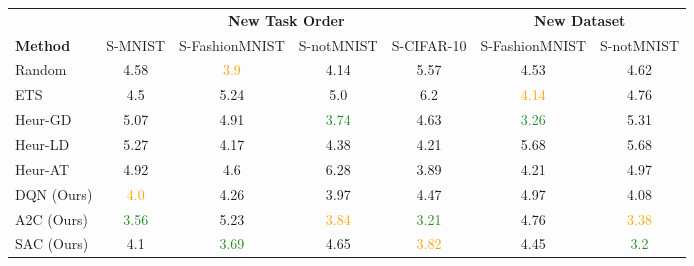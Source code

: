 \begin{tabular}{lcccccc}
\toprule	
	& \multicolumn{4}{c}{\textbf{New Task Order}}        & \multicolumn{2}{c}{\textbf{New Dataset}} \\
	\cmidrule(lr){2-5} \cmidrule(lr){6-7}
	\textbf{Method} & S-MNIST & S-FashionMNIST & S-notMNIST & S-CIFAR-10 & S-FashionMNIST        & S-notMNIST       \\
	\midrule
	Random          & 4.58    & \textcolor{orange}{3.9}            & 4.14       & 5.57       & 4.53                  & 4.62             \\
	ETS             & 4.5     & 5.24           & 5.0          & 6.2        & \textcolor{orange}{4.14}                  & 4.76             \\
	\midrule
	Heur-GD         & 5.07    & 4.91           & \textcolor{forestgreen}{3.74}       & 4.63       & \textcolor{forestgreen}{3.26}                  & 5.31             \\
	Heur-LD         & 5.27    & 4.17           & 4.38       & 4.21       & 5.68                  & 5.68             \\
	Heur-AT         & 4.92    & 4.6            & 6.28       & 3.89       & 4.21                  & 4.97             \\
	\midrule 
	DQN (Ours)      & \textcolor{orange}{4.0}       & 4.26           & 3.97       & 4.47       & 4.97                  & 4.08             \\
	A2C (Ours)      & \textcolor{forestgreen}{3.56}    & 5.23           & \textcolor{orange}{3.84}       & \textcolor{forestgreen}{3.21}       & 4.76                  & \textcolor{orange}{3.38}             \\
	SAC (Ours)      & 4.1     & \textcolor{forestgreen}{3.69}           & 4.65       & \textcolor{orange}{3.82}       & 4.45                  & \textcolor{forestgreen}{3.2} \\
	\bottomrule             
\end{tabular}